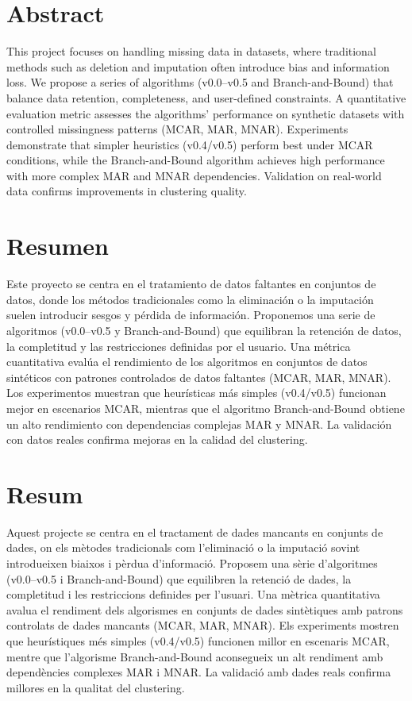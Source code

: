 \documentclass[a4paper,12pt]{article}
\begin{document}
\tableofcontents
\newpage
\listoffigures
\listoftables
\newpage

\section{Abstract}
This project focuses on handling missing data in datasets, where traditional methods such as deletion and imputation often introduce bias and information loss. We propose a series of algorithms (v0.0–v0.5 and Branch-and-Bound) that balance data retention, completeness, and user-defined constraints. A quantitative evaluation metric assesses the algorithms’ performance on synthetic datasets with controlled missingness patterns (MCAR, MAR, MNAR). Experiments demonstrate that simpler heuristics (v0.4/v0.5) perform best under MCAR conditions, while the Branch-and-Bound algorithm achieves high performance with more complex MAR and MNAR dependencies. Validation on real-world data confirms improvements in clustering quality.

\section{Resumen}
Este proyecto se centra en el tratamiento de datos faltantes en conjuntos de datos, donde los métodos tradicionales como la eliminación o la imputación suelen introducir sesgos y pérdida de información. Proponemos una serie de algoritmos (v0.0–v0.5 y Branch-and-Bound) que equilibran la retención de datos, la completitud y las restricciones definidas por el usuario. Una métrica cuantitativa evalúa el rendimiento de los algoritmos en conjuntos de datos sintéticos con patrones controlados de datos faltantes (MCAR, MAR, MNAR). Los experimentos muestran que heurísticas más simples (v0.4/v0.5) funcionan mejor en escenarios MCAR, mientras que el algoritmo Branch-and-Bound obtiene un alto rendimiento con dependencias complejas MAR y MNAR. La validación con datos reales confirma mejoras en la calidad del clustering.

\section{Resum}
Aquest projecte se centra en el tractament de dades mancants en conjunts de dades, on els mètodes tradicionals com l’eliminació o la imputació sovint introdueixen biaixos i pèrdua d’informació. Proposem una sèrie d’algoritmes (v0.0–v0.5 i Branch-and-Bound) que equilibren la retenció de dades, la completitud i les restriccions definides per l’usuari. Una mètrica quantitativa avalua el rendiment dels algorismes en conjunts de dades sintètiques amb patrons controlats de dades mancants (MCAR, MAR, MNAR). Els experiments mostren que heurístiques més simples (v0.4/v0.5) funcionen millor en escenaris MCAR, mentre que l’algorisme Branch-and-Bound aconsegueix un alt rendiment amb dependències complexes MAR i MNAR. La validació amb dades reals confirma millores en la qualitat del clustering.
\newpage
\end{document}
